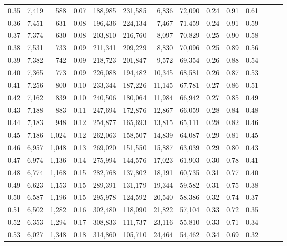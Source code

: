 \begin{tabular}{rrrrrrrrrrrrrr}
0.35 &  7,419 &    588 &  0.07 &  188,985 &  231,585 &   6,836 &  72,090 &  0.24 &  0.91 &      0.61 \\
0.36 &  7,451 &    631 &  0.08 &  196,436 &  224,134 &   7,467 &  71,459 &  0.24 &  0.91 &      0.59 \\
0.37 &  7,374 &    630 &  0.08 &  203,810 &  216,760 &   8,097 &  70,829 &  0.25 &  0.90 &      0.58 \\
0.38 &  7,531 &    733 &  0.09 &  211,341 &  209,229 &   8,830 &  70,096 &  0.25 &  0.89 &      0.56 \\
0.39 &  7,382 &    742 &  0.09 &  218,723 &  201,847 &   9,572 &  69,354 &  0.26 &  0.88 &      0.54 \\
0.40 &  7,365 &    773 &  0.09 &  226,088 &  194,482 &  10,345 &  68,581 &  0.26 &  0.87 &      0.53 \\
0.41 &  7,256 &    800 &  0.10 &  233,344 &  187,226 &  11,145 &  67,781 &  0.27 &  0.86 &      0.51 \\
0.42 &  7,162 &    839 &  0.10 &  240,506 &  180,064 &  11,984 &  66,942 &  0.27 &  0.85 &      0.49 \\
0.43 &  7,188 &    883 &  0.11 &  247,694 &  172,876 &  12,867 &  66,059 &  0.28 &  0.84 &      0.48 \\
0.44 &  7,183 &    948 &  0.12 &  254,877 &  165,693 &  13,815 &  65,111 &  0.28 &  0.82 &      0.46 \\
0.45 &  7,186 &  1,024 &  0.12 &  262,063 &  158,507 &  14,839 &  64,087 &  0.29 &  0.81 &      0.45 \\
0.46 &  6,957 &  1,048 &  0.13 &  269,020 &  151,550 &  15,887 &  63,039 &  0.29 &  0.80 &      0.43 \\
0.47 &  6,974 &  1,136 &  0.14 &  275,994 &  144,576 &  17,023 &  61,903 &  0.30 &  0.78 &      0.41 \\
0.48 &  6,774 &  1,168 &  0.15 &  282,768 &  137,802 &  18,191 &  60,735 &  0.31 &  0.77 &      0.40 \\
0.49 &  6,623 &  1,153 &  0.15 &  289,391 &  131,179 &  19,344 &  59,582 &  0.31 &  0.75 &      0.38 \\
0.50 &  6,587 &  1,196 &  0.15 &  295,978 &  124,592 &  20,540 &  58,386 &  0.32 &  0.74 &      0.37 \\
0.51 &  6,502 &  1,282 &  0.16 &  302,480 &  118,090 &  21,822 &  57,104 &  0.33 &  0.72 &      0.35 \\
0.52 &  6,353 &  1,294 &  0.17 &  308,833 &  111,737 &  23,116 &  55,810 &  0.33 &  0.71 &      0.34 \\
0.53 &  6,027 &  1,348 &  0.18 &  314,860 &  105,710 &  24,464 &  54,462 &  0.34 &  0.69 &      0.32 \\

\end{tabular}
